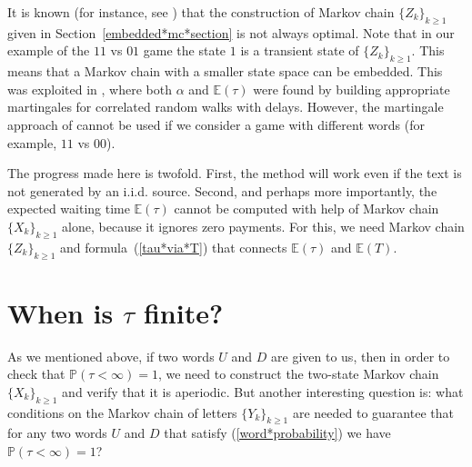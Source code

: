 \documentclass{amsart}
\newcommand{\PP}{{\mathbb{P}}}
\newcommand{\EE}{{\mathbb{E}}}
\newcommand{\1}{{\mathbf{1}}}
\begin{document}
It is known (for instance, see \cite{Lladser2007}) that the construction of  Markov chain $\{Z_k\}_{k\geq 1}$ given in
Section~\ref{embedded*mc*section} is not always optimal. Note that in our example of
the $11$ vs $01$ game the state $1$ is a transient state of $\{Z_k\}_{k\geq 1}$. This means that a
Markov chain with a smaller state space can be embedded. This was exploited in
\cite{Pozdnyakov2025}, where both $\alpha$ and $\EE(\tau)$ were found by building
appropriate martingales for correlated random walks with delays. However, the martingale
approach of \cite{Pozdnyakov2025} cannot be used if we consider a game with different
words (for example, $11$ vs $00$).

The progress  made here is twofold. First, the method will work even if
the text is not generated by an i.i.d. source. Second, and perhaps more importantly,
the expected waiting time $\EE(\tau)$ cannot be computed with help of Markov chain
$\{X_k\}_{k\geq 1}$ alone, because it ignores zero payments. For this, we need
Markov chain $\{Z_k\}_{k\geq 1}$ and formula~(\ref{tau*via*T}) that connects
$\EE(\tau)$  and $\EE(T)$.

\section{When is $\tau$ finite?}

As we mentioned above, if two words $U$ and $D$ are given to us, then in order to
check that $\PP(\tau<\infty)=1$, we need to construct the two-state Markov chain
$\{X_k\}_{k\geq 1}$ and verify that it is aperiodic. But another interesting question
is: what conditions on the Markov chain of letters $\{Y_k\}_{k\geq 1}$ are needed to guarantee
that for any two words $U$ and $D$ that satisfy (\ref{word*probability})
we have $\PP(\tau<\infty)=1$?
\end{document}

